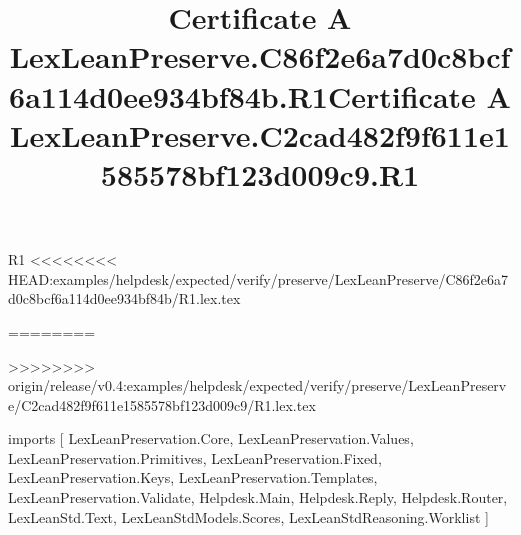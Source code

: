 \begin{lexlean}{R1}
<<<<<<<< HEAD:examples/helpdesk/expected/verify/preserve/LexLeanPreserve/C86f2e6a7d0c8bcf6a114d0ee934bf84b/R1.lex.tex
\title{Certificate A LexLeanPreserve.C86f2e6a7d0c8bcf6a114d0ee934bf84b.R1}
========
\title{Certificate A LexLeanPreserve.C2cad482f9f611e1585578bf123d009c9.R1}
>>>>>>>> origin/release/v0.4:examples/helpdesk/expected/verify/preserve/LexLeanPreserve/C2cad482f9f611e1585578bf123d009c9/R1.lex.tex
\begin{coremodule}
imports [
  LexLeanPreservation.Core,
  LexLeanPreservation.Values,
  LexLeanPreservation.Primitives,
  LexLeanPreservation.Fixed,
  LexLeanPreservation.Keys,
  LexLeanPreservation.Templates,
  LexLeanPreservation.Validate,
  Helpdesk.Main,
  Helpdesk.Reply,
  Helpdesk.Router,
  LexLeanStd.Text,
  LexLeanStdModels.Scores,
  LexLeanStdReasoning.Worklist
]


\end{coremodule}
\end{lexlean}
